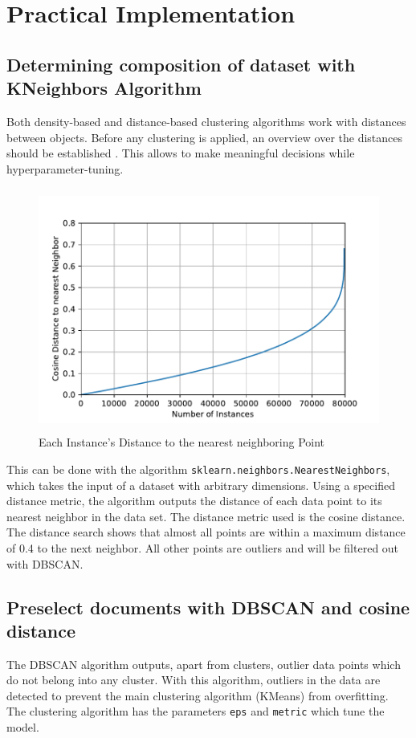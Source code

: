 \section{Practical Implementation}

\subsection{Determining composition of dataset with KNeighbors Algorithm}


Both density-based and distance-based clustering algorithms work with distances between objects. Before any clustering is applied, an overview over the distances should be established \cite{maklinDBSCANPythonExample2022a}. This allows to make meaningful decisions while hyperparameter-tuning.

 \begin{figure}[!h]
	\centering
	\includegraphics[height=8cm]{Bilder/models/kneighbors.pdf}
	\caption{Each Instance's Distance to the nearest neighboring Point}
	\label{fig:dbscan-plot}
\end{figure}

This can be done with the algorithm \lstinline|sklearn.neighbors.NearestNeighbors|, which takes the input of a dataset with arbitrary dimensions. Using a specified distance metric, the algorithm outputs the distance of each data point to its nearest neighbor in the data set. The distance metric used is the cosine distance.
The distance search shows that almost all points are within a maximum distance of 0.4 to the next neighbor. All other points are outliers and will be filtered out with \ac{DBSCAN}.



\subsection{Preselect documents with \ac{DBSCAN} and cosine distance}
The \ac{DBSCAN} algorithm outputs, apart from clusters, outlier data points which do not belong into any cluster. With this algorithm, outliers in the data are detected to prevent the main clustering algorithm (KMeans) from overfitting. 
The clustering algorithm has the parameters \lstinline|eps| and \lstinline|metric| which tune the model.

